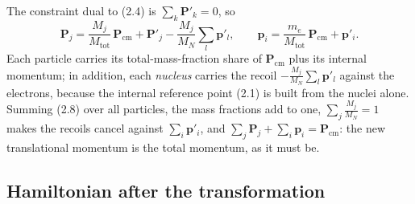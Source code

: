 The constraint dual to (2.4) is $\sum_k\mathbf{P}'_k = 0$, so
\begin{equation}
\boxed{\;\mathbf{P}_j = \frac{M_j}{M_{\mathrm{tot}}}\,\mathbf{P}_{\mathrm{cm}}+\mathbf{P}'_j-\frac{M_j}{M_N}\sum_l\mathbf{p}'_l,\qquad \mathbf{p}_i = \frac{m_e}{M_{\mathrm{tot}}}\,\mathbf{P}_{\mathrm{cm}}+\mathbf{p}'_i.\;} \tag{2.8}
\end{equation}
Each particle carries its total-mass-fraction share of $\mathbf{P}_{\mathrm{cm}}$ plus its internal momentum; in addition, each \emph{nucleus} carries the recoil $-\frac{M_j}{M_N}\sum_l\mathbf{p}'_l$ against the electrons, because the internal reference point (2.1) is built from the nuclei alone. Summing (2.8) over all particles, the mass fractions add to one, $\sum_j\frac{M_j}{M_N}=1$ makes the recoils cancel against $\sum_i\mathbf{p}'_i$, and $\sum_j\mathbf{P}_j+\sum_i\mathbf{p}_i = \mathbf{P}_{\mathrm{cm}}$: the new translational momentum is the total momentum, as it must be.

\subsection{Hamiltonian after the transformation}

